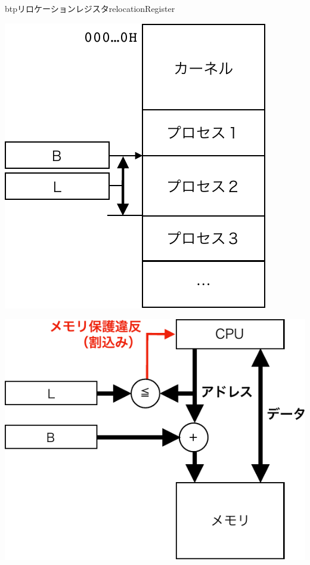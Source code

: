 \begin{myfig}{btp}{リロケーションレジスタ}{relocationRegister}
  \begin{minipage}{0.49\columnwidth}
    \begin{center}
      \includegraphics[scale=0.66]{Fig/relocationAddrSpace-crop.pdf}
      \label{fig:relocationAddrSpace}
    \end{center}
  \end{minipage}
  \begin{minipage}{0.49\columnwidth}
    \begin{center}
      \includegraphics[scale=0.66]{Fig/relocationHardware-crop.pdf}
      \label{fig:relocationHardware}
    \end{center}
  \end{minipage}
\end{myfig}

